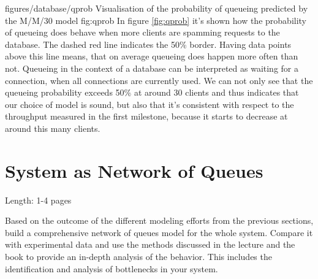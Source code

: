 \documentclass[11pt]{article}
\begin{document}
		{figures/database/qprob} {Visualisation of the probability of queueing predicted by the M/M/30 model} {fig:qprob}
In figure \ref{fig:qprob} it's shown how the probability of queueing does behave when more clients are spamming requests to the database. The dashed red line indicates the 50\% border. Having data points above this line means, that on average queueing does happen more often than not. Queueing in the context of a database can be interpreted as waiting for a connection, when all connections are currently used. We can not only see that the queueing probability exceeds 50\% at around 30 clients and thus indicates that our choice of model is sound, but also that it's consistent with respect to the throughput measured in the first milestone, because it starts to decrease at around this many clients.

\section{System as Network of Queues}\label{sec:network-of-queues}

Length: 1-4 pages

Based on the outcome of the different modeling efforts from the previous sections, build a comprehensive network of queues model for the whole system. Compare it with experimental data and use the methods discussed in the lecture and the book to provide an in-depth analysis of the behavior. This includes the identification and analysis of bottlenecks in your system.
\end{document}
